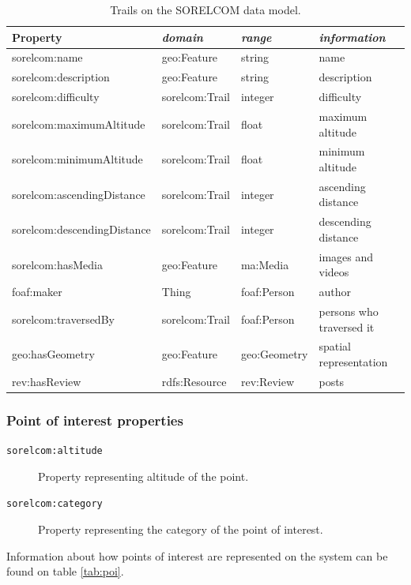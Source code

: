 \begin{table}[ht]
  \centering
  \caption{Trails on the SORELCOM data model.}\label{tab:trail}
  \begin{tabular}{llll}
    \toprule
      \textbf{Property} & \emph{domain}  & \emph{range} & \emph{information}\\
    \midrule
      sorelcom:name & geo:Feature  & string & name \\
      sorelcom:description & geo:Feature & string  & description \\
      sorelcom:difficulty & sorelcom:Trail & integer & difficulty \\
      sorelcom:maximumAltitude & sorelcom:Trail & float & maximum altitude \\
      sorelcom:minimumAltitude & sorelcom:Trail & float & minimum altitude \\
      sorelcom:ascendingDistance & sorelcom:Trail & integer & ascending distance \\
      sorelcom:descendingDistance & sorelcom:Trail & integer & descending distance \\
      sorelcom:hasMedia & geo:Feature & ma:Media & images and videos \\
      foaf:maker & Thing & foaf:Person & author \\
      sorelcom:traversedBy & sorelcom:Trail & foaf:Person & persons who traversed it \\ 
      geo:hasGeometry & geo:Feature & geo:Geometry & spatial representation \\
      rev:hasReview & rdfs:Resource & rev:Review & posts \\
    \bottomrule
  \end{tabular}
\end{table}

\subsubsection*{Point of interest properties}

\begin{description}
\item[\texttt{sorelcom:altitude}] Property representing altitude of the point. 
\item[\texttt{sorelcom:category}] Property representing the category of the point of interest.
\end{description}

Information about how points of interest are represented on the system can be found on table \ref{tab:poi}.

